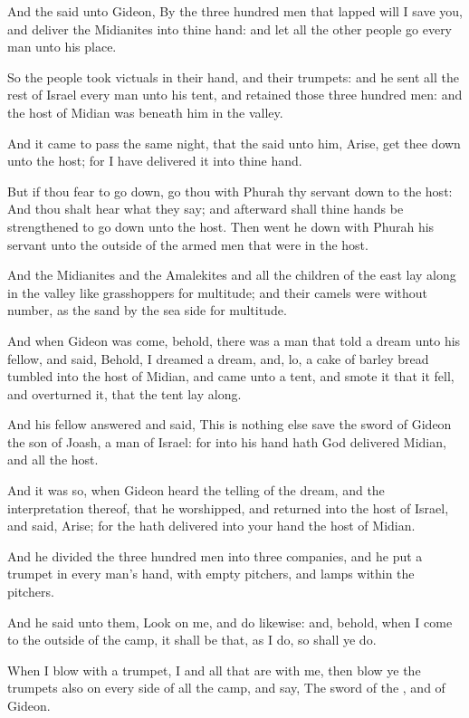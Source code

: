 \Verse And the \LORD said unto Gideon, By the three hundred men that lapped will I save you, and deliver the Midianites into thine hand: and let all the other people go every man unto his place.

\Verse So the people took victuals in their hand, and their trumpets: and he sent all the rest of Israel every man unto his tent, and retained those three hundred men: and the host of Midian was beneath him in the valley.

\Verse And it came to pass the same night, that the \LORD said unto him, Arise, get thee down unto the host; for I have delivered it into thine hand.

\Verse But if thou fear to go down, go thou with Phurah thy servant down to the host: \Verse And thou shalt hear what they say; and afterward shall thine hands be strengthened to go down unto the host. Then went he down with Phurah his servant unto the outside of the armed men that were in the host.

\Verse And the Midianites and the Amalekites and all the children of the east lay along in the valley like grasshoppers for multitude; and their camels were without number, as the sand by the sea side for multitude.

\Verse And when Gideon was come, behold, there was a man that told a dream unto his fellow, and said, Behold, I dreamed a dream, and, lo, a cake of barley bread tumbled into the host of Midian, and came unto a tent, and smote it that it fell, and overturned it, that the tent lay along.

\Verse And his fellow answered and said, This is nothing else save the sword of Gideon the son of Joash, a man of Israel: for into his hand hath God delivered Midian, and all the host.

\Verse And it was so, when Gideon heard the telling of the dream, and the interpretation thereof, that he worshipped, and returned into the host of Israel, and said, Arise; for the \LORD hath delivered into your hand the host of Midian.

\Verse And he divided the three hundred men into three companies, and he put a trumpet in every man's hand, with empty pitchers, and lamps within the pitchers.

\Verse And he said unto them, Look on me, and do likewise: and, behold, when I come to the outside of the camp, it shall be that, as I do, so shall ye do.

\Verse When I blow with a trumpet, I and all that are with me, then blow ye the trumpets also on every side of all the camp, and say, The sword of the \LORD, and of Gideon.

